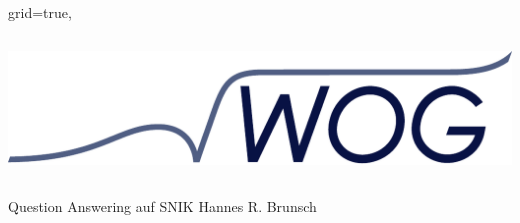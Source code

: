 \documentclass[portrait,final,a0paper,fontscale=0.320]{imiseposter}
\begin{document}
\begin{poster}%
  {grid=true,}
  {\includegraphics[height=4.5cm, width=15cm, keepaspectratio]{img/logos/wog-logo-ohne-text.pdf}} 
  {Question Answering auf SNIK}
  {Hannes R. Brunsch}
  {%
  }


\end{poster}
\end{document}
